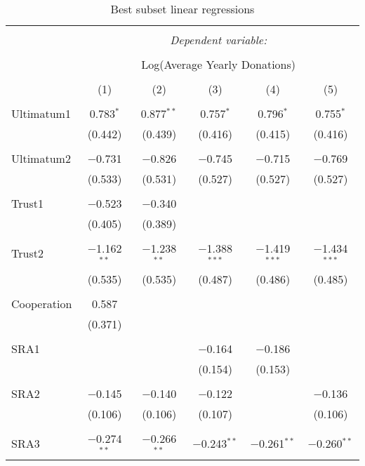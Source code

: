 \begin{table}[H] \centering 
  \caption{Best subset linear regressions} 
  \label{} 
     \begin{adjustbox}{width=\textwidth, totalheight=\baselineskip}
\begin{tabular}{@{\extracolsep{5pt}}lccccc} 
\\[-1.8ex]\hline 
\hline \\[-1.8ex] 
 & \multicolumn{5}{c}{\textit{Dependent variable:}} \\ 
\cline{2-6} 
\\[-1.8ex] & \multicolumn{5}{c}{Log(Average Yearly Donations)} \\ 
\\[-1.8ex] & (1) & (2) & (3) & (4) & (5)\\ 
\hline \\[-1.8ex] 
 Ultimatum1 & 0.783$^{*}$ & 0.877$^{**}$ & 0.757$^{*}$ & 0.796$^{*}$ & 0.755$^{*}$ \\ 
  & (0.442) & (0.439) & (0.416) & (0.415) & (0.416) \\ 
  & & & & & \\ 
 Ultimatum2 & $-$0.731 & $-$0.826 & $-$0.745 & $-$0.715 & $-$0.769 \\ 
  & (0.533) & (0.531) & (0.527) & (0.527) & (0.527) \\ 
  & & & & & \\ 
 Trust1 & $-$0.523 & $-$0.340 &  &  &  \\ 
  & (0.405) & (0.389) &  &  &  \\ 
  & & & & & \\ 
 Trust2 & $-$1.162$^{**}$ & $-$1.238$^{**}$ & $-$1.388$^{***}$ & $-$1.419$^{***}$ & $-$1.434$^{***}$ \\ 
  & (0.535) & (0.535) & (0.487) & (0.486) & (0.485) \\ 
  & & & & & \\ 
 Cooperation & 0.587 &  &  &  &  \\ 
  & (0.371) &  &  &  &  \\ 
  & & & & & \\ 
 SRA1 &  &  & $-$0.164 & $-$0.186 &  \\ 
  &  &  & (0.154) & (0.153) &  \\ 
  & & & & & \\ 
 SRA2 & $-$0.145 & $-$0.140 & $-$0.122 &  & $-$0.136 \\ 
  & (0.106) & (0.106) & (0.107) &  & (0.106) \\ 
  & & & & & \\ 
 SRA3 & $-$0.274$^{**}$ & $-$0.266$^{**}$ & $-$0.243$^{**}$ & $-$0.261$^{**}$ & $-$0.260$^{**}$ \\ 

\end{tabular}
\end{adjustbox}
\end{table}

